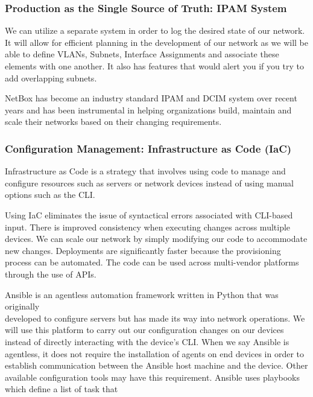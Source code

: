 \documentclass[12pt, letterpaper]{article}
\begin{document}
	\subsubsection{Production as the Single Source of Truth: IPAM System}
We can utilize a separate system in order to log the desired state of our network. It will allow for efficient planning in the development of our network as we will be able to define VLANs, Subnets, Interface Assignments and associate these elements with one another. It also has features that would alert you if you try to add overlapping subnets. 

\smallskip

NetBox has become an industry standard IPAM and DCIM system over recent years and has been instrumental in helping organizations build, maintain and scale their networks based on their changing requirements.


	\subsubsection{Configuration Management: Infrastructure as Code (IaC)}
Infrastructure as Code is a strategy that involves using code to manage and configure resources such as servers or network devices instead of using manual options such as the CLI. 

\smallskip

Using IaC eliminates the issue of syntactical errors associated with CLI-based input. There is improved consistency when executing changes across multiple devices. We can scale our network by simply modifying our code to accommodate new changes. Deployments are significantly faster because the provisioning process can be automated. The code can be used across multi-vendor platforms through the use of APIs.

\smallskip

Ansible is an agentless automation framework written in Python that was originally \\ developed to configure servers but has made its way into network operations. We will use this platform to carry out our configuration changes on our devices instead of directly interacting with the device's CLI. When we say Ansible is agentless, it does not require the installation of agents on end devices in order to establish communication between the Ansible host machine and the device. Other available configuration tools may have this requirement. Ansible uses playbooks which define a list of task that 
\end{document}
